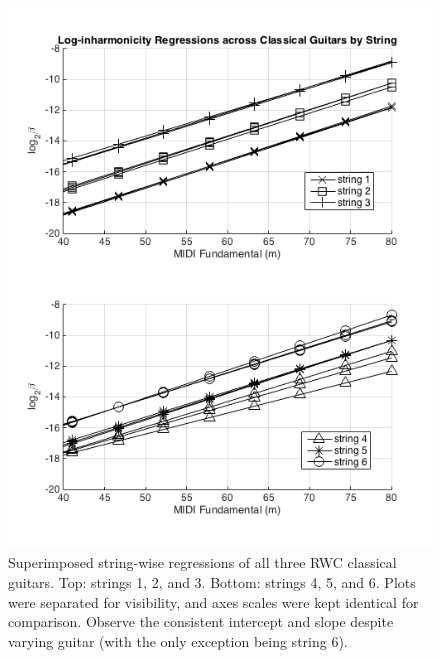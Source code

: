 \documentclass[12pt]{cmuthesis}
\begin{document}
\begin{figure}[!htbp] 
\centering
\includegraphics[scale=0.75]{traj-compare-cg}
\caption{Superimposed string-wise regressions of all three RWC classical guitars. Top: strings 1, 2, and 3. Bottom: strings 4, 5, and 6. Plots were separated for visibility, and axes scales were kept identical for comparison. Observe the consistent intercept and slope despite varying guitar (with the only exception being string 6).}
\label{fig:cg-traj-comp}
\end{figure}
\end{document}
